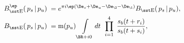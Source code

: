 \begin{equation}\label{braidcoeff1}\begin{aligned}
B_{\rm\sst E}^{\ep}(\,p_s\,|\,p_u)\;=\;&
e^{\pi i\ep(\De_s+\De_u-\De_{\2}-\De_{\1})}
B_{\rm\sst E}(\,p_s\,|\,p_u), \\
B_{\rm\sst E}(\,p_s\,|\,p_u)\;=\;&
{\rm m}(p_u)
\int\limits_{\BR+i0}dt\;\,\prod_{i=1}^4\;\frac{s_b(t+r_i)}{s_b(t+s_i)},
\end{aligned}\end{equation}

